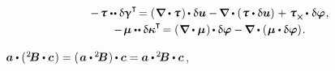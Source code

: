 \nopagebreak\vspace{-0.4em}\begin{equation*}
\begin{array}{c}
- \hspace{.2ex} \forcestresstensor \dotdotp \variation{\distortiontensor}^{\T} \hspace{-0.32ex}
= \left( \hspace{.12ex} \boldnabla \dotp \forcestresstensor \hspace{.12ex} \right) \hspace{-0.16ex} \dotp \variation{\fieldofdisplacements}
- \hspace{-0.15ex} \boldnabla \dotp \left( \hspace{.1ex} \forcestresstensor \dotp \variation{\fieldofdisplacements} \right) \hspace{.1ex}
+ \hspace{.1ex} \forcestresstensor_{\Xcompanion} \hspace{-0.1ex} \dotp \hspace{.1ex} \variation{\fieldofrotations} \hspace{.1ex} ,
\\[.25em]
%
- \hspace{.2ex} \couplestresstensor \dotdotp \variation{\wrynesstensor}^{\T} \hspace{-0.32ex}
= \left( \hspace{.12ex} \boldnabla \dotp \couplestresstensor \hspace{.12ex} \right) \hspace{-0.16ex} \dotp \variation{\fieldofrotations}
- \hspace{-0.15ex} \boldnabla \dotp \left( \hspace{.1ex} \couplestresstensor \dotp \variation{\fieldofrotations} \right) \hspace{-0.25ex} .
\end{array}
\end{equation*}

\vspace{-0.25em}\noindent
{}
${
  \bm{a} \dotp ( \hspace{.1ex} \somebivalenttensor \dotp \bm{c} \hspace{.2ex} )
  = ( \hspace{.2ex} \bm{a} \dotp \hspace{-0.1ex} \somebivalenttensor \hspace{.1ex} ) \hspace{-0.1ex} \dotp \bm{c}
  = \bm{a} \dotp \hspace{-0.12ex} \somebivalenttensor \dotp \bm{c} \hspace{.2ex}
}$,

